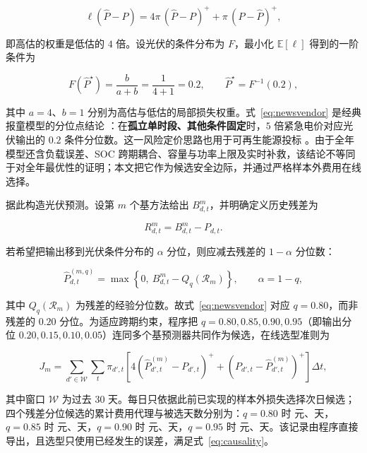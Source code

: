 \begin{equation}
	\ell(\hat P-P)=4\pi\,(\hat P-P)^{+}+\pi\,(P-\hat P)^{+},
	\label{eq:asymmetric-loss}
\end{equation}

即高估的权重是低估的 $4$ 倍。设光伏的条件分布为 $F$，最小化 $\mathbb E[\ell]$ 得到的一阶条件为

\begin{equation}
	F(\hat P^{\star})=\frac{b}{a+b}=\frac{1}{4+1}=0.2 ,
	\qquad \hat P^{\star}=F^{-1}(0.2),
	\label{eq:newsvendor}
\end{equation}

其中 $a=4$、$b=1$ 分别为高估与低估的局部损失权重。式~\eqref{eq:newsvendor} 是经典报童模型的分位点结论 \cite{qin2011newsvendor}：在\textbf{孤立单时段、其他条件固定}时，$5$ 倍紧急电价对应光伏输出的 $0.2$ 条件分位数。这一风险定价思路也用于可再生能源投标 \cite{polat2024renewable}。由于全年模型还含负载误差、SOC 跨期耦合、容量与功率上限及实时补救，该结论不等同于对全年最优性的证明；本文把它作为候选安全边际，并通过严格样本外费用在线选择。

据此构造光伏预测。设第 $m$ 个基方法给出 $B^m_{d,t}$，并明确定义历史残差为

\begin{equation}
	R^m_{d,t}=B^m_{d,t}-P_{d,t}.
	\label{eq:pv-residual}
\end{equation}

若希望把输出移到光伏条件分布的 $\alpha$ 分位，则应减去残差的 $1-\alpha$ 分位数：

\begin{equation}
	\hat P^{(m,q)}_{d,t}=\max\left\{0,\ B^{m}_{d,t}-Q_{q}\!\left(\mathcal R_m\right)\right\},
	\qquad \alpha=1-q,
	\label{eq:pv-forecast}
\end{equation}

其中 $Q_q(\mathcal R_m)$ 为残差的经验分位数。故式~\eqref{eq:newsvendor} 对应 $q=0.80$，而非残差的 $0.20$ 分位。为适应跨期约束，程序把 $q=0.80,0.85,0.90,0.95$（即输出分位 $0.20,0.15,0.10,0.05$）连同多个基预测器共同作为候选，在线选型准则为

\begin{equation}
	J_m=\sum_{d'\in\mathcal W}\sum_{t}\pi_{d',t}
	\left[4\left(\hat P^{(m)}_{d',t}-P_{d',t}\right)^{+}
	+\left(P_{d',t}-\hat P^{(m)}_{d',t}\right)^{+}\right]\Delta t ,
	\label{eq:pv-score}
\end{equation}

其中窗口 $\mathcal W$ 为过去 $30$ 天。每日只依据此前已实现的样本外损失选择次日候选；四个残差分位候选的累计费用代理与被选天数分别为：$q=0.80$ 时 \PvQuantEightyScore 元、\PvQuantEightyDays 天，$q=0.85$ 时 \PvQuantEightyFiveScore 元、\PvQuantEightyFiveDays 天，$q=0.90$ 时 \PvQuantNinetyScore 元、\PvQuantNinetyDays 天，$q=0.95$ 时 \PvQuantNinetyFiveScore 元、\PvQuantNinetyFiveDays 天。该记录由程序直接导出，且选型只使用已经发生的误差，满足式~\eqref{eq:causality}。

